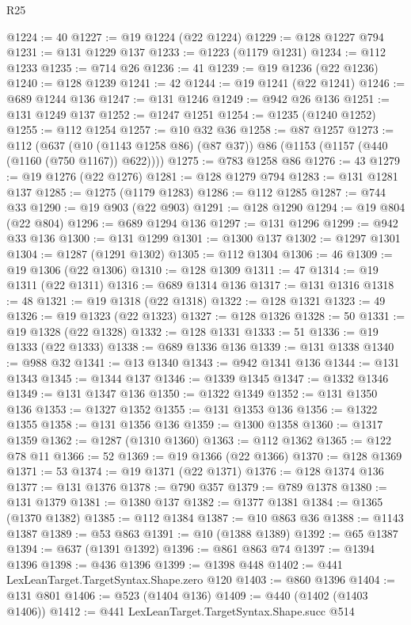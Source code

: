 \begin{lexlean}{R25}
\begin{coremodule}
@1224 := 40
@1227 := @19 @1224 (@22 @1224)
@1229 := @128 @1227 @794
@1231 := @131 @1229 @137
@1233 := @1223 (@1179 @1231)
@1234 := @112 @1233
@1235 := @714 @26
@1236 := 41
@1239 := @19 @1236 (@22 @1236)
@1240 := @128 @1239
@1241 := 42
@1244 := @19 @1241 (@22 @1241)
@1246 := @689 @1244 @136
@1247 := @131 @1246
@1249 := @942 @26 @136
@1251 := @131 @1249 @137
@1252 := @1247 @1251
@1254 := @1235 (@1240 @1252)
@1255 := @112 @1254
@1257 := @10 @32 @36
@1258 := @87 @1257
@1273 := @112
    (@637 (@10 (@1143 @1258 @86) (@87 @37)) @86 (@1153 (@1157 (@440 (@1160 (@750 @1167)) @622))))
@1275 := @783 @1258 @86
@1276 := 43
@1279 := @19 @1276 (@22 @1276)
@1281 := @128 @1279 @794
@1283 := @131 @1281 @137
@1285 := @1275 (@1179 @1283)
@1286 := @112 @1285
@1287 := @744 @33
@1290 := @19 @903 (@22 @903)
@1291 := @128 @1290
@1294 := @19 @804 (@22 @804)
@1296 := @689 @1294 @136
@1297 := @131 @1296
@1299 := @942 @33 @136
@1300 := @131 @1299
@1301 := @1300 @137
@1302 := @1297 @1301
@1304 := @1287 (@1291 @1302)
@1305 := @112 @1304
@1306 := 46
@1309 := @19 @1306 (@22 @1306)
@1310 := @128 @1309
@1311 := 47
@1314 := @19 @1311 (@22 @1311)
@1316 := @689 @1314 @136
@1317 := @131 @1316
@1318 := 48
@1321 := @19 @1318 (@22 @1318)
@1322 := @128 @1321
@1323 := 49
@1326 := @19 @1323 (@22 @1323)
@1327 := @128 @1326
@1328 := 50
@1331 := @19 @1328 (@22 @1328)
@1332 := @128 @1331
@1333 := 51
@1336 := @19 @1333 (@22 @1333)
@1338 := @689 @1336 @136
@1339 := @131 @1338
@1340 := @988 @32
@1341 := @13 @1340
@1343 := @942 @1341 @136
@1344 := @131 @1343
@1345 := @1344 @137
@1346 := @1339 @1345
@1347 := @1332 @1346
@1349 := @131 @1347 @136
@1350 := @1322 @1349
@1352 := @131 @1350 @136
@1353 := @1327 @1352
@1355 := @131 @1353 @136
@1356 := @1322 @1355
@1358 := @131 @1356 @136
@1359 := @1300 @1358
@1360 := @1317 @1359
@1362 := @1287 (@1310 @1360)
@1363 := @112 @1362
@1365 := @122 @78 @11
@1366 := 52
@1369 := @19 @1366 (@22 @1366)
@1370 := @128 @1369
@1371 := 53
@1374 := @19 @1371 (@22 @1371)
@1376 := @128 @1374 @136
@1377 := @131 @1376
@1378 := @790 @357
@1379 := @789 @1378
@1380 := @131 @1379
@1381 := @1380 @137
@1382 := @1377 @1381
@1384 := @1365 (@1370 @1382)
@1385 := @112 @1384
@1387 := @10 @863 @36
@1388 := @1143 @1387
@1389 := @53 @863
@1391 := @10 (@1388 @1389)
@1392 := @65 @1387
@1394 := @637 (@1391 @1392)
@1396 := @861 @863 @74
@1397 := @1394 @1396
@1398 := @436 @1396
@1399 := @1398 @448
@1402 := @441 LexLeanTarget.TargetSyntax.Shape.zero @120
@1403 := @860 @1396
@1404 := @131 @801
@1406 := @523 (@1404 @136)
@1409 := @440 (@1402 (@1403 @1406))
@1412 := @441 LexLeanTarget.TargetSyntax.Shape.succ @514

\end{coremodule}
\end{lexlean}
